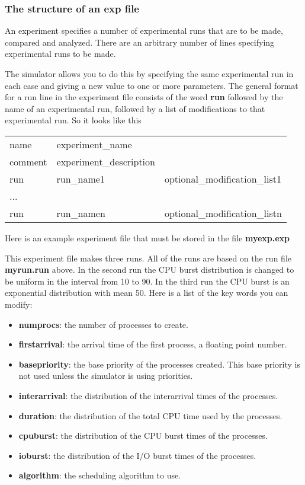 \documentclass[16pt]{article}
\begin{document}
\subsubsection*{The structure of an exp file}

An experiment specifies a number of experimental runs that are to be made, compared
and analyzed. There are an arbitrary number of lines specifying experimental runs to be
made.

The simulator allows you to do this by specifying the same experimental run in each case
and giving a new value to one or more parameters. The general format for a run line in
the experiment file consists of the word \textbf{run} followed by the name of an experimental
run, followed by a list of modifications to that experimental run. So it looks like this

\begin{tabular}{l l l}
name  & experiment\_name & \\
comment & experiment\_description & \\
run & run\_name1 & optional\_modification\_list1 \\
... & &\\
run & run\_namen & optional\_modification\_listn \\
\end{tabular}

Here is an example experiment file that must be stored in the file \textbf{myexp.exp}



This experiment file makes three runs. All of the runs are based on the run file
\textbf{myrun.run} above. In the second run the CPU burst distribution is changed to be uniform
in the interval from 10 to 90. In the third run the CPU burst is an exponential distribution
with mean 50.
Here is a list of the key words you can modify:


\begin{itemize}
\item \textbf{numprocs}: the number of processes to create.
\item \textbf{firstarrival}: the arrival time of the first process, a floating point number.
\item \textbf{basepriority}: the base priority of the processes created. This base priority is not
used unless the simulator is using priorities.
\item \textbf{interarrival}: the distribution of the interarrival times of the processes.
\item \textbf{duration}: the distribution of the total CPU time used by the processes.
\item \textbf{cpuburst}: the distribution of the CPU burst times of the processes.
\item \textbf{ioburst}: the distribution of the I/O burst times of the processes.
\item \textbf{algorithm}: the scheduling algorithm to use.
\end{itemize}
\end{document}
